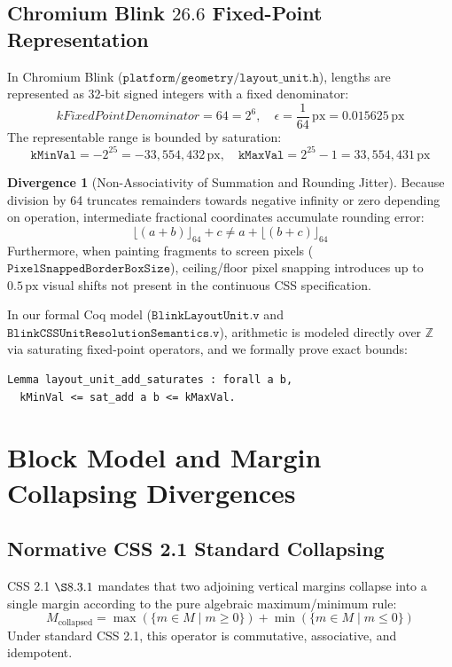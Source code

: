 \documentclass[11pt,a4paper]{article}
\theoremstyle{definition}
\newtheorem{divergence}{Divergence}[section]
\begin{document}
\subsection{Chromium Blink $26.6$ Fixed-Point Representation}
In Chromium Blink ($\mathtt{platform/geometry/layout\_unit.h}$), lengths are represented as 32-bit signed integers with a fixed denominator:
\begin{equation}
    kFixedPointDenominator = 64 = 2^6, \quad \epsilon = \frac{1}{64}\,\text{px} = 0.015625\,\text{px}
\end{equation}
The representable range is bounded by saturation:
\begin{equation}
    \mathtt{kMinVal} = -2^{25} = -33{,}554{,}432\,\text{px}, \quad \mathtt{kMaxVal} = 2^{25} - 1 = 33{,}554{,}431\,\text{px}
\end{equation}

\begin{divergence}[Non-Associativity of Summation and Rounding Jitter]
Because division by 64 truncates remainders towards negative infinity or zero depending on operation, intermediate fractional coordinates accumulate rounding error:
\begin{equation}
    \lfloor (a + b) \rfloor_{64} + c \neq a + \lfloor (b + c) \rfloor_{64}
\end{equation}
Furthermore, when painting fragments to screen pixels ($\mathtt{PixelSnappedBorderBoxSize}$), ceiling/floor pixel snapping introduces up to $0.5\,\text{px}$ visual shifts not present in the continuous CSS specification.
\end{divergence}

In our formal Coq model ($\mathtt{BlinkLayoutUnit.v}$ and $\mathtt{BlinkCSSUnitResolutionSemantics.v}$), arithmetic is modeled directly over $\mathbb{Z}$ via saturating fixed-point operators, and we formally prove exact bounds:
\begin{lstlisting}[language=Caml,basicstyle=\small\ttfamily]
Lemma layout_unit_add_saturates : forall a b,
  kMinVal <= sat_add a b <= kMaxVal.
\end{lstlisting}

\section{Block Model and Margin Collapsing Divergences}

\subsection{Normative CSS 2.1 Standard Collapsing}
CSS 2.1 $\S 8.3.1$ mandates that two adjoining vertical margins collapse into a single margin according to the pure algebraic maximum/minimum rule:
\begin{equation}
    M_{\text{collapsed}} = \max(\{ m \in M \mid m \ge 0 \}) + \min(\{ m \in M \mid m \le 0 \})
\end{equation}
Under standard CSS 2.1, this operator is commutative, associative, and idempotent.
\end{document}

